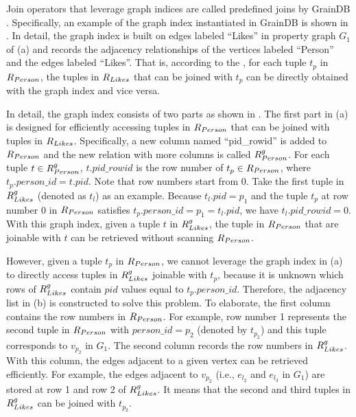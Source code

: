 Join operators that leverage graph indices are called predefined joins by GrainDB \cite{graindb}.
Specifically, an example of the graph index instantiated in GrainDB is shown in .
In detail, the graph index is built on edges labeled ``Likes'' in property graph $G_1$ of (a) and records the adjacency relationships of the vertices labeled ``Person'' and the edges labeled ``Likes''.
That is, according to the \rgmapping, for each tuple $t_p$ in ${R_{Person}}$, the tuples in ${R_{Likes}}$ that can be joined with $t_p$ can be directly obtained with the graph index and vice versa.

In detail, the graph index consists of two parts as shown in .
The first part in (a) is designed for efficiently accessing tuples in ${R_{Person}}$ that can be joined with tuples in ${R_{Likes}}$.
Specifically, a new column named ``pid\_rowid'' is added to ${R_{Person}}$ and the new relation with more columns is called ${R^g_{Person}}$.
For each tuple $t \in {\ensuremath R^g_{Person}}$, $t.pid\_rowid$ is the row number of $t_p \in {\ensuremath R_{Person}}$, where $t_p.person\_id = t.pid$.
Note that row numbers start from 0.
Take the first tuple in ${R^g_{Likes}}$ (denoted as $t_l$) as an example.
Because $t_l.pid = p_1$ and the tuple $t_p$ at row number 0 in ${R_{Person}}$ satisfies $t_p.person\_id = p_1 = t_l.pid$, we have $t_l.pid\_rowid = 0$.
With this graph index, given a tuple $t$ in ${R^g_{Likes}}$, the tuple in ${R_{Person}}$ that are joinable with $t$ can be retrieved without scanning ${R_{Person}}$.

However, given a tuple $t_p$ in ${R_{Person}}$, we cannot leverage the graph index in (a) to directly access tuples in ${R^g_{Likes}}$ joinable with $t_p$, because it is unknown which rows of ${R^g_{Likes}}$ contain $pid$ values equal to $t_p.person\_id$.
Therefore, the adjacency list in (b) is constructed to solve this problem.
To elaborate, the first column contains the row numbers in ${R_{Person}}$.
For example, row number 1 represents the second tuple in ${R_{Person}}$ with $person\_id = p_2$ (denoted by $t_{p_2}$) and this tuple corresponds to $v_{p_2}$ in $G_1$.
The second column records the row numbers in ${R^g_{Likes}}$.
With this column, the edges adjacent to a given vertex can be retrieved efficiently.
For example, the edges adjacent to $v_{p_2}$ (i.e., $e_{l_2}$ and $e_{l_3}$ in $G_1$) are stored at row 1 and row 2 of ${R^g_{Likes}}$.
It means that the second and third tuples in ${R^g_{Likes}}$ can be joined with $t_{p_2}$.

